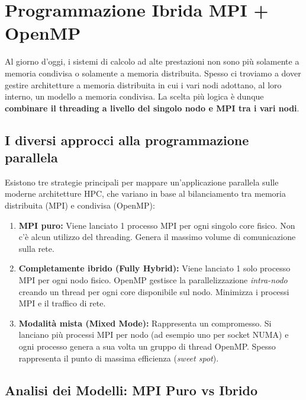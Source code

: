 \chapter{Programmazione Ibrida MPI + OpenMP}

Al giorno d'oggi, i sistemi di calcolo ad alte prestazioni non sono più solamente a memoria condivisa o solamente a memoria distribuita. Spesso ci troviamo a dover gestire architetture a memoria distribuita in cui i vari nodi adottano, al loro interno, un modello a memoria condivisa. La scelta più logica è dunque \textbf{combinare il threading a livello del singolo nodo e MPI tra i vari nodi}.

\section{I diversi approcci alla programmazione parallela}
Esistono tre strategie principali per mappare un'applicazione parallela sulle moderne architetture HPC, che variano in base al bilanciamento tra memoria distribuita (MPI) e condivisa (OpenMP):

\begin{enumerate}
    \item \textbf{MPI puro:} Viene lanciato 1 processo MPI per ogni singolo core fisico. Non c'è alcun utilizzo del threading. Genera il massimo volume di comunicazione sulla rete.
    \item \textbf{Completamente ibrido (Fully Hybrid):} Viene lanciato 1 solo processo MPI per ogni nodo fisico. OpenMP gestisce la parallelizzazione \textit{intra-nodo} creando un thread per ogni core disponibile sul nodo. Minimizza i processi MPI e il traffico di rete.
    \item \textbf{Modalità mista (Mixed Mode):} Rappresenta un compromesso. Si lanciano più processi MPI per nodo (ad esempio uno per socket NUMA) e ogni processo genera a sua volta un gruppo di thread OpenMP. Spesso rappresenta il punto di massima efficienza (\textit{sweet spot}).
\end{enumerate}


\section{Analisi dei Modelli: MPI Puro vs Ibrido}

